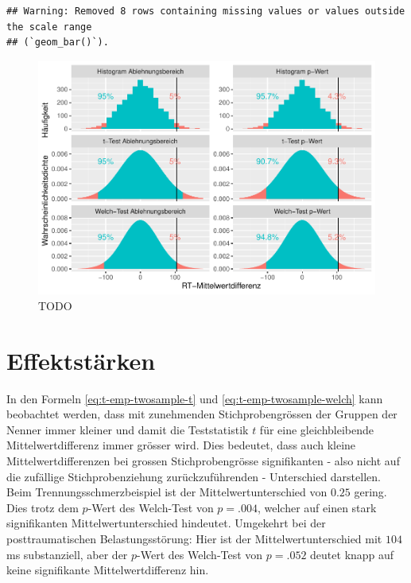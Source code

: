 \documentclass[
]{book}
\theoremstyle{definition}
\theoremstyle{definition}
\theoremstyle{definition}
\theoremstyle{definition}
\theoremstyle{remark}
\begin{document}
\begin{verbatim}
## Warning: Removed 8 rows containing missing values or values outside the scale range
## (`geom_bar()`).
\end{verbatim}

\begin{figure}
\centering
\includegraphics{aps_statistik1_files/figure-latex/exm-emotional-stroop-hist-pval-reja-1.pdf}
\caption{\label{fig:exm-emotional-stroop-hist-pval-reja}TODO}
\end{figure}

\section{Effektstärken}\label{effektstuxe4rken}

In den Formeln \eqref{eq:t-emp-twosample-t} und \eqref{eq:t-emp-twosample-welch} kann beobachtet werden, dass mit zunehmenden Stichprobengrössen der Gruppen der Nenner immer kleiner und damit die Teststatistik \(t\) für eine gleichbleibende Mittelwertdifferenz immer grösser wird. Dies bedeutet, dass auch kleine Mittelwertdifferenzen bei grossen Stichprobengrösse signifikanten - also nicht auf die zufällige Stichprobenziehung zurückzuführenden - Unterschied darstellen. Beim Trennungsschmerzbeispiel ist der Mittelwertunterschied von \(0.25\) gering. Dies trotz dem \(p\)-Wert des Welch-Test von \(p=.004\), welcher auf einen stark signifikanten Mittelwertunterschied hindeutet. Umgekehrt bei der posttraumatischen Belastungsstörung: Hier ist der Mittelwertunterschied mit \(104\) ms substanziell, aber der \(p\)-Wert des Welch-Test von \(p=.052\) deutet knapp auf keine signifikante Mittelwertdifferenz hin.
\end{document}
